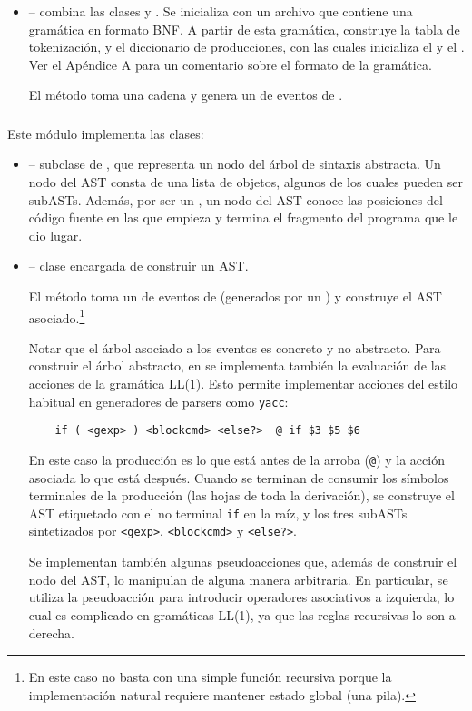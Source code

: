 \documentclass{article}
\begin{document}
\begin{itemize}
\item {} -- combina las clases  y .
      Se inicializa con un archivo que contiene una gram\'atica
      en formato BNF. A partir de esta gram\'atica, construye
      la tabla de tokenizaci\'on, y el diccionario de producciones,
      con las cuales inicializa el  y el .
      Ver el Ap\'endice A para un comentario sobre el formato
      de la gram\'atica.

      El m\'etodo  toma una cadena y genera un
       de eventos de .
\end{itemize}

\subsubsection{}

Este m\'odulo implementa las clases:
\begin{itemize}
\item {} --
subclase de ,
que representa un nodo del \'arbol de sintaxis abstracta.
Un nodo del AST consta de una lista de objetos,
algunos de los cuales pueden ser subASTs.
Adem\'as, por ser un , un nodo
del AST conoce las posiciones del c\'odigo fuente en las
que empieza y termina el fragmento del programa
que le dio lugar.

\item {} -- clase encargada de construir un AST.

El m\'etodo  toma un  de
eventos de  (ge\-ne\-ra\-dos por un )
y construye el AST asociado.\footnote{
En este caso no basta con una simple funci\'on recursiva
porque la implementaci\'on natural requiere mantener estado
global (una pila).}

Notar que el \'arbol asociado a los eventos es concreto y
no abstracto. Para construir el \'arbol abstracto, en
 se implementa tambi\'en la eva\-lua\-ci\'on de las acciones
de la gram\'atica LL(1). Esto permite implementar acciones del estilo
habitual en generadores de parsers como \texttt{yacc}:
\begin{verbatim}
    if ( <gexp> ) <blockcmd> <else?>  @ if $3 $5 $6
\end{verbatim}
En este caso la producci\'on es lo que est\'a antes de la arroba (\verb|@|)
y la acci\'on asociada lo que est\'a despu\'es.
Cuando se terminan de consumir los s\'imbolos terminales de la
producci\'on (las hojas de toda la derivaci\'on),
se construye el AST etiquetado con el no terminal \verb|if| en
la ra\'iz, y los tres subASTs sintetizados por \verb|<gexp>|,
\verb|<blockcmd>| y \verb|<else?>|.

Se implementan tambi\'en algunas pseudoacciones que,
adem\'as de construir el nodo del AST, lo manipulan
de alguna manera arbitraria. En particular,
se utiliza la pseudoacci\'on  para introducir operadores asociativos
a izquierda, lo cual es complicado en gram\'aticas LL(1),
ya que las reglas recursivas lo son a derecha.
\end{itemize}
\end{document}
